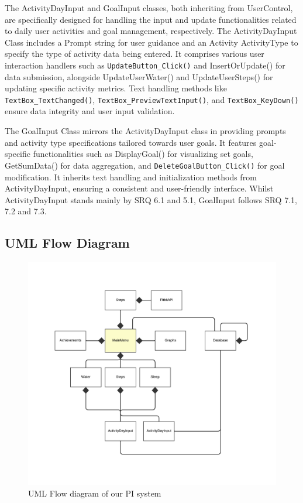 \documentclass[12pt]{article}
\begin{document}
The ActivityDayInput and GoalInput classes, both inheriting from UserControl,
are specifically designed for handling the input and update functionalities
related to daily user activities and goal management, respectively. The
ActivityDayInput Class includes a Prompt string for user guidance and an
Activity ActivityType to specify the type of activity data being entered. It
comprises various user interaction handlers such as \texttt{UpdateButton\_Click()} and
InsertOrUpdate() for data submission, alongside UpdateUserWater() and
UpdateUserSteps() for updating specific activity metrics. Text handling methods
like \texttt{TextBox\_TextChanged()}, \texttt{TextBox\_PreviewTextInput()}, and
\texttt{TextBox\_KeyDown()} ensure data integrity and user input validation.\par

The GoalInput Class mirrors the ActivityDayInput class in providing prompts and
activity type specifications tailored towards user goals. It features
goal-specific functionalities such as DisplayGoal() for visualizing set goals,
GetSumData() for data aggregation, and \texttt{DeleteGoalButton\_Click()} for
goal modification. It inherits text handling and initialization methods from
ActivityDayInput, ensuring a consistent and user-friendly interface. Whilst
ActivityDayInput stands mainly by SRQ 6.1 and 5.1, GoalInput follows SRQ 7.1,
7.2 and 7.3.\par

\subsection{UML Flow Diagram}

\begin{figure}[!ht]
  \centering
  \includegraphics[width = 0.7\linewidth]{UML Flow diagram}
  \caption{UML Flow diagram of our PI system}
  \label{fig:flow}
\end{figure}
\end{document}
